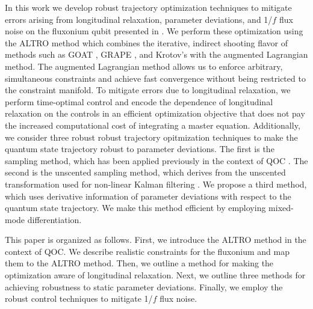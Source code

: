 In this work we develop robust trajectory optimization techniques to mitigate
errors arising from longitudinal relaxation, parameter deviations, and 1/$f$ flux noise
on the fluxonium qubit presented in \cite{zhang2020universal}. We perform these optimization using the ALTRO
method \cite{howell2019altro} which combines the iterative, indirect shooting
flavor of methods such as GOAT \cite{machnes2015gradient}, GRAPE
\cite{khaneja2005optimal, leung2017speedup}, and Krotov's \cite{goerz2019krotov}
with the augmented Lagrangian method. The augmented Lagrangian method
allows us to enforce arbitrary, simultaneous constraints and achieve
fast convergence without being restricted to the constraint
manifold. To mitigate errors due to longitudinal
relaxation, we perform time-optimal control and
encode the dependence of longitudinal relaxation
on the controls in an efficient optimization objective that does
not pay the increased computational cost of integrating a master equation.
Additionally, we consider three robust
robust trajectory opitmization techniques to make the
quantum state trajectory robust to parameter deviations.
The first is the sampling method, which has been applied
previously in the context of QOC
\cite{carvalho2020error, reinhold2019controlling, rembold2020introduction}.
The second is the unscented sampling
method, which derives from the unscented transformation used
for non-linear Kalman filtering
\cite{julier2004unscented, lee2013sigma, manchester2016derivative}.
We propose a third method, which uses derivative information
of parameter deviations with respect to the quantum state trajectory.
We make this method efficient by employing mixed-mode differentiation.

This paper is organized as follows.
First, we introduce the ALTRO method in the context of QOC.
We describe realistic constraints for the fluxonium and
map them to the ALTRO method. Then, we
outline a method for making the optimization aware of longitudinal
relaxation. Next, we outline three methods for achieving
robustness to static parameter deviations. Finally,
we employ the robust control techniques to mitigate 1/$f$ flux noise.
